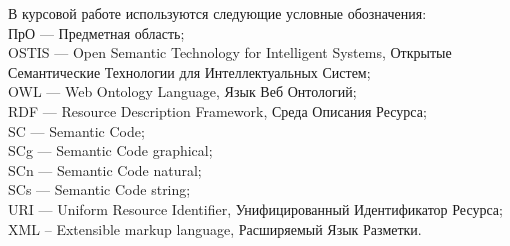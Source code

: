 \label{sec:reduction}
В курсовой работе используются следующие условные обозначения: \\
ПрО --- Предметная область;\\
OSTIS --- Open Semantic Technology for Intelligent Systems, Открытые Семантические Технологии для Интеллектуальных Систем;\\
OWL --- Web Ontology Language, Язык Веб Онтологий;\\
RDF --- Resource Description Framework, Среда Описания Ресурса;\\
SC --- Semantic Code;\\
SCg --- Semantic Code graphical;\\
SCn --- Semantic Code natural;\\
SCs --- Semantic Code string;\\
URI --- Uniform Resource Identifier, Унифицированный Идентификатор Ресурса;\\
XML -- Extensible markup language, Расширяемый Язык Разметки.